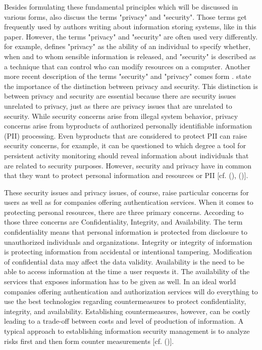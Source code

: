 Besides formulating these fundamental principles which will be discussed in various forms, \cite{Saltzer:PICS} also discuss the terms "privacy" and "security". Those terms get frequently used by authors writing about information storing systems, like in this paper. However, the terms "privacy" and "security" are often used very differently. \cite{Saltzer:PICS} for example, defines "privacy" as the ability of an individual to specify whether, when and to whom sensible information is released, and "security" is described as a technique that can control who can modify resources on a computer. Another more recent description of the terms "security" and "privacy" comes form \cite{Brooks:2017:IPE}. \cite{Brooks:2017:IPE} state the importance of the distinction between privacy and security. This distinction is between privacy and security are essential because there are security issues unrelated to privacy, just as there are privacy issues that are unrelated to security. While security concerns arise from illegal system behavior, privacy concerns arise from byproducts of authorized personally identifiable information (PII) processing. Even byproducts that are considered to protect PII can raise security concerns, for example, it can be questioned to which degree a tool for persistent activity monitoring should reveal information about individuals that are related to security purposes. However, security and privacy have in common that they want to protect personal information and resources or PII [cf. (\cite{Brooks:2017:IPE}), (\cite{Saltzer:PICS})].

These security issues and privacy issues, of course, raise particular concerns for users as well as for companies offering authentication services. When it comes to protecting personal resources, there are three primary concerns. According to \cite{Todorov:2007:MUI} those three concerns are Confidentiality, Integrity, and Availability. The term confidentiality means that personal information is protected from 
disclosure to unauthorized individuals and organizations. Integrity or integrity of information is protecting information from accidental or intentional tampering. Modification of confidential data may affect the data validity. Availability is the need to be able to access information at the time a user requests it. The availability of the services that exposes information has to be given as well. In an ideal world companies offering authentication and authorization services will do everything to use the best technologies regarding countermeasures to protect confidentiality, integrity, and availability. Establishing countermeasures, however, can be costly leading to a trade-off between costs and level of production of information. A typical approach to establishing information security management is to analyze risks first and then form counter measurements [cf. (\cite{Todorov:2007:MUI})]. 

